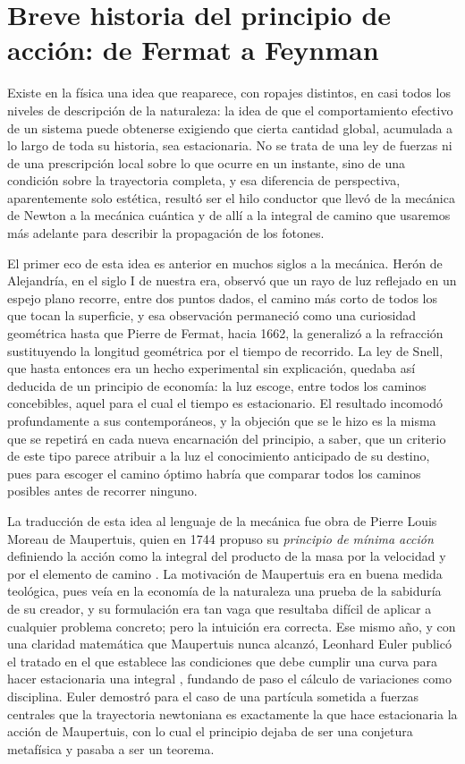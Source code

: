 \section{Breve historia del principio de acción: de Fermat a Feynman}

    Existe en la física una idea que reaparece, con ropajes distintos, en casi todos los niveles de descripción de la naturaleza: la idea de que el comportamiento efectivo de un sistema puede obtenerse exigiendo que cierta cantidad global, acumulada a lo largo de toda su historia, sea estacionaria. No se trata de una ley de fuerzas ni de una prescripción local sobre lo que ocurre en un instante, sino de una condición sobre la trayectoria completa, y esa diferencia de perspectiva, aparentemente solo estética, resultó ser el hilo conductor que llevó de la mecánica de Newton a la mecánica cuántica y de allí a la integral de camino que usaremos más adelante para describir la propagación de los fotones.

    El primer eco de esta idea es anterior en muchos siglos a la mecánica. Herón de Alejandría, en el siglo I de nuestra era, observó que un rayo de luz reflejado en un espejo plano recorre, entre dos puntos dados, el camino más corto de todos los que tocan la superficie, y esa observación permaneció como una curiosidad geométrica hasta que Pierre de Fermat, hacia 1662, la generalizó a la refracción sustituyendo la longitud geométrica por el tiempo de recorrido. La ley de Snell, que hasta entonces era un hecho experimental sin explicación, quedaba así deducida de un principio de economía: la luz escoge, entre todos los caminos concebibles, aquel para el cual el tiempo es estacionario. El resultado incomodó profundamente a sus contemporáneos, y la objeción que se le hizo es la misma que se repetirá en cada nueva encarnación del principio, a saber, que un criterio de este tipo parece atribuir a la luz el conocimiento anticipado de su destino, pues para escoger el camino óptimo habría que comparar todos los caminos posibles antes de recorrer ninguno.

    La traducción de esta idea al lenguaje de la mecánica fue obra de Pierre Louis Moreau de Maupertuis, quien en 1744 propuso su \textit{principio de mínima acción} definiendo la acción como la integral del producto de la masa por la velocidad y por el elemento de camino \citep{maupertuis1744accord}. La motivación de Maupertuis era en buena medida teológica, pues veía en la economía de la naturaleza una prueba de la sabiduría de su creador, y su formulación era tan vaga que resultaba difícil de aplicar a cualquier problema concreto; pero la intuición era correcta. Ese mismo año, y con una claridad matemática que Maupertuis nunca alcanzó, Leonhard Euler publicó el tratado en el que establece las condiciones que debe cumplir una curva para hacer estacionaria una integral \citep{euler1744methodus}, fundando de paso el cálculo de variaciones como disciplina. Euler demostró para el caso de una partícula sometida a fuerzas centrales que la trayectoria newtoniana es exactamente la que hace estacionaria la acción de Maupertuis, con lo cual el principio dejaba de ser una conjetura metafísica y pasaba a ser un teorema.

